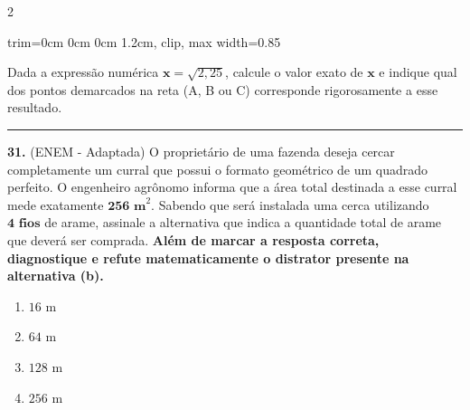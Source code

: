 \documentclass[twoside, 10pt, a4paper]{article}
\newlength{\espacoPreQuestao}\setlength{\espacoPreQuestao}{0.1cm}
\newlength{\espacoQuestao}\setlength{\espacoQuestao}{0.2cm}
\newcommand{\larguraTikz}{0.85\linewidth}
\begin{document}
\begin{multicols*}{2}
\begin{center}
\begin{adjustbox}{trim=0cm 0cm 0cm 1.2cm, clip, max width=\larguraTikz}
\end{adjustbox}
\end{center}
Dada a expressão numérica $ \textbf{x} = \sqrt{2,25} $, calcule o valor exato de $ \textbf{x} $ e indique qual dos pontos demarcados na reta (A, B ou C) corresponde rigorosamente a esse resultado.
\par\vspace{\espacoQuestao}

\noindent\textcolor{CorLinha}{\rule{\linewidth}{0.5pt}} 
\par\vspace{\espacoPreQuestao}
\textbf{31.} (ENEM - Adaptada) O proprietário de uma fazenda deseja cercar completamente um curral que possui o formato geométrico de um quadrado perfeito. O engenheiro agrônomo informa que a área total destinada a esse curral mede exatamente $ \textbf{256 m}^{2} $. Sabendo que será instalada uma cerca utilizando $ \textbf{4 fios} $ de arame, assinale a alternativa que indica a quantidade total de arame que deverá ser comprada. \textbf{Além de marcar a resposta correta, diagnostique e refute matematicamente o distrator presente na alternativa (b).}
\begin{enumerate}[label=\alph*)]
    \item $ 16 \text{ m} $
    \item $ 64 \text{ m} $
    \item $ 128 \text{ m} $
    \item $ 256 \text{ m} $
\end{enumerate}
\par\vspace{\espacoQuestao}


\end{multicols*}
\end{document}
